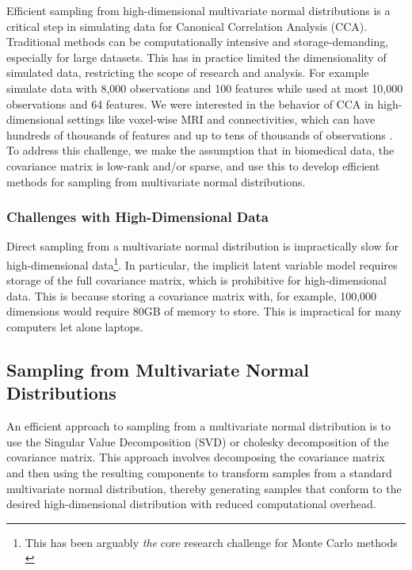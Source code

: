 Efficient sampling from high-dimensional multivariate normal distributions is a critical step in simulating data for Canonical Correlation Analysis (CCA). Traditional methods can be computationally intensive and storage-demanding, especially for large datasets.
This has in practice limited the dimensionality of simulated data, restricting the scope of research and analysis.
For example \citet{matkovic2023contribution} simulate data with 8,000 observations and 100 features while \citet{helmer2020stability} used at most 10,000 observations and 64 features.
We were interested in the behavior of CCA in high-dimensional settings like voxel-wise MRI and connectivities, which can have hundreds of thousands of features \citep{jack2008alzheimer} and up to tens of thousands of observations \citep{sudlow2015uk}.
To address this challenge, we make the assumption that in biomedical data, the covariance matrix is low-rank and/or sparse, and use this to develop efficient methods for sampling from multivariate normal distributions.

\subsubsection{Challenges with High-Dimensional Data}
Direct sampling from a multivariate normal distribution is impractically slow for high-dimensional data\footnote{This has been arguably \textit{the} core research challenge for Monte Carlo methods \citep{mackay1998introduction}}.
In particular, the implicit latent variable model requires storage of the full covariance matrix, which is prohibitive for high-dimensional data.
This is because storing a covariance matrix with, for example, 100,000 dimensions would require 80GB of memory to store.
This is impractical for many computers let alone laptops.

\subsection{Sampling from Multivariate Normal Distributions}
An efficient approach to sampling from a multivariate normal distribution is to use the Singular Value Decomposition (SVD) or cholesky decomposition of the covariance matrix.
This approach involves decomposing the covariance matrix and then using the resulting components to transform samples from a standard multivariate normal distribution, thereby generating samples that conform to the desired high-dimensional distribution with reduced computational overhead.

